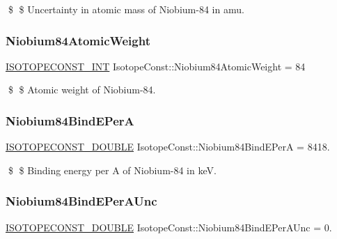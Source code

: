 \$ \$ Uncertainty in atomic mass of Niobium-\/84 in amu. \mbox{\label{group___isotope_const-_niobium-_nb84_ga0bd887dd6a22a00e4fe5a78c0fd18c45}} 
\subsubsection{\texorpdfstring{Niobium84\+Atomic\+Weight}{Niobium84AtomicWeight}}
{\footnotesize\ttfamily \mbox{\hyperlink{group___isotope_const-_macros_ga5f18360b3e99483a35c32d789e62621c}{I\+S\+O\+T\+O\+P\+E\+C\+O\+N\+S\+T\+\_\+\+I\+NT}} Isotope\+Const\+::\+Niobium84\+Atomic\+Weight = 84}

\$ \$ Atomic weight of Niobium-\/84. \mbox{\label{group___isotope_const-_niobium-_nb84_ga9744388dfa7c7a28ea419c57c492131f}} 
\subsubsection{\texorpdfstring{Niobium84\+Bind\+E\+PerA}{Niobium84BindEPerA}}
{\footnotesize\ttfamily \mbox{\hyperlink{group___isotope_const-_macros_ga8f45a7272ce02c0b4c65c44636ed719a}{I\+S\+O\+T\+O\+P\+E\+C\+O\+N\+S\+T\+\_\+\+D\+O\+U\+B\+LE}} Isotope\+Const\+::\+Niobium84\+Bind\+E\+PerA = 8418.}

\$ \$ Binding energy per A of Niobium-\/84 in keV. \mbox{\label{group___isotope_const-_niobium-_nb84_gaf331bd5dfa0c29ea83c8c2458b2dd9ed}} 
\subsubsection{\texorpdfstring{Niobium84\+Bind\+E\+Per\+A\+Unc}{Niobium84BindEPerAUnc}}
{\footnotesize\ttfamily \mbox{\hyperlink{group___isotope_const-_macros_ga8f45a7272ce02c0b4c65c44636ed719a}{I\+S\+O\+T\+O\+P\+E\+C\+O\+N\+S\+T\+\_\+\+D\+O\+U\+B\+LE}} Isotope\+Const\+::\+Niobium84\+Bind\+E\+Per\+A\+Unc = 0.}

